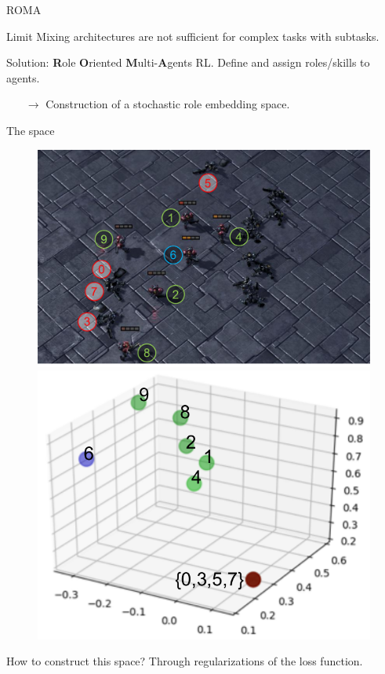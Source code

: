 \documentclass{beamer}
\begin{document}
    \begin{frame}{ROMA}

        \pause
        \begin{alertblock}{Limit}
            Mixing architectures are not sufficient for complex tasks with subtasks.
        \end{alertblock}
        \pause
        \begin{exampleblock}{Solution:  \textbf{R}ole \textbf{O}riented \textbf{M}ulti-\textbf{A}gents RL.}
            Define and assign roles/skills to agents.
            \begin{itemize}
                \item[$\rightarrow$] Construction of a stochastic role embedding space.
            \end{itemize}
        \end{exampleblock}

    \end{frame}

    \begin{frame}{The space}
        \begin{figure}
            \includegraphics[height=0.35\linewidth]{img/10m_vs_11m-g4.pdf}\hfill
            \includegraphics[height=0.35\linewidth]{img/10m_vs_11m-r4.pdf}\hfill
        \end{figure}
        \pause
        \begin{block}{}
            How to construct this space? Through regularizations of the loss function.
        \end{block}
    \end{frame}
\end{document}
